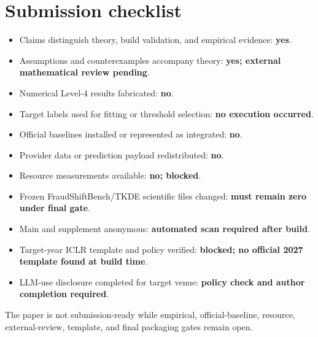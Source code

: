 \section{Submission checklist}

\begin{itemize}
  \item Claims distinguish theory, build validation, and empirical evidence: \textbf{yes}.
  \item Assumptions and counterexamples accompany theory: \textbf{yes; external mathematical review pending}.
  \item Numerical Level-4 results fabricated: \textbf{no}.
  \item Target labels used for fitting or threshold selection: \textbf{no execution occurred}.
  \item Official baselines installed or represented as integrated: \textbf{no}.
  \item Provider data or prediction payload redistributed: \textbf{no}.
  \item Resource measurements available: \textbf{no; blocked}.
  \item Frozen FraudShiftBench/TKDE scientific files changed: \textbf{must remain zero under final gate}.
  \item Main and supplement anonymous: \textbf{automated scan required after build}.
  \item Target-year ICLR template and policy verified: \textbf{blocked; no official 2027 template found at build time}.
  \item LLM-use disclosure completed for target venue: \textbf{policy check and author completion required}.
\end{itemize}

The paper is not submission-ready while empirical, official-baseline, resource, external-review, template, and final packaging gates remain open.
